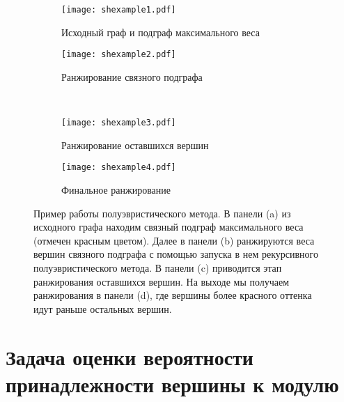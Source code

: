 \begin{figure}
    \begin{subfigure}{.5\textwidth}
        \centering
        \texttt{[image: shexample1.pdf]}
        \caption{\footnotesize{Исходный граф и подграф максимального веса}} 
    \end{subfigure}%
    \begin{subfigure}{.5\textwidth}
        \centering
        \texttt{[image: shexample2.pdf]}
        \caption{\footnotesize{Ранжирование связного подграфа}}
    \end{subfigure}\\%
    \begin{subfigure}{.5\textwidth}\centering
        \texttt{[image: shexample3.pdf]}
        \caption{\footnotesize{Ранжирование оставшихся вершин}}
    \end{subfigure}%
    \begin{subfigure}{.5\textwidth}
        \centering
        \texttt{[image: shexample4.pdf]}
        \caption{\footnotesize{Финальное ранжирование}}
    \end{subfigure}
    \centering
    \caption{
        Пример работы полуэвристического метода.  В панели (a) из исходного
        графа находим связный подграф максимального веса (отмечен красным
        цветом).  Далее в панели (b) ранжируются веса вершин связного подграфа
        с помощью запуска в нем рекурсивного полуэвристического метода.
        В панели (c) приводится этап ранжирования оставшихся вершин.  На выходе
        мы получаем ранжирования в панели (d), где вершины более красного
        оттенка идут раньше остальных вершин.
    }%
    \label{fig:shexample}%
\end{figure}





\section{Задача оценки вероятности принадлежности вершины к модулю}


